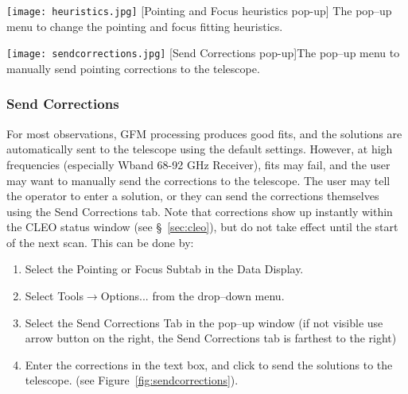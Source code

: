 \vspace{2.5mm}

\noindent\begin{minipage}[t]{0.45\linewidth}
\setlength{\abovecaptionskip}{0pt}\setlength{\belowcaptionskip}{0pt}
\vspace{0pt}
\texttt{[image: heuristics.jpg]}
[Pointing and Focus heuristics pop-up]
{The pop--up menu to change the pointing and focus fitting heuristics.
\label{fig:heuristic} }
\end{minipage}
\hfill
\begin{minipage}[t]{0.45\linewidth}
\setlength{\abovecaptionskip}{0pt}\setlength{\belowcaptionskip}{0pt}
\vspace{0pt}
\texttt{[image: sendcorrections.jpg]}
[Send Corrections pop-up]{The pop--up menu to manually send pointing corrections
to the telescope.\label{fig:sendcorrections} }
\end{minipage}

\vspace{-2.5mm}

\subsubsection{Send Corrections}\label{sec:gfmsendcorrections}

For most observations, \gls{GFM} processing produces good fits, and the solutions are
automatically sent to the telescope using the default settings.  However, at high
frequencies (especially \gls{Wband} 68-92 GHz Receiver), fits may fail, and the user may want
to manually send the corrections to the telescope.  The user may tell the operator to
enter a solution, or they can send the corrections themselves using the Send Corrections
tab. Note that corrections show up instantly within the \gls{CLEO} status window
(see \S~\ref{sec:cleo}), but do not take effect until the start of the next scan.
This can be done by:

\begin{enumerate}[label=\bfseries{Step \arabic*.},leftmargin=*,
itemsep=0pt]
\item Select the Pointing or Focus Subtab in the Data Display.
\item Select {\btt Tools}$\rightarrow${\btt Options...} from the drop--down menu.
\item Select the Send Corrections Tab in the pop--up window (if not visible use
arrow button on the right, the Send Corrections tab is farthest to the right)
\item Enter the corrections in the text box, and click  to send the
solutions to the telescope. (see Figure~\ref{fig:sendcorrections}).
\end{enumerate}

